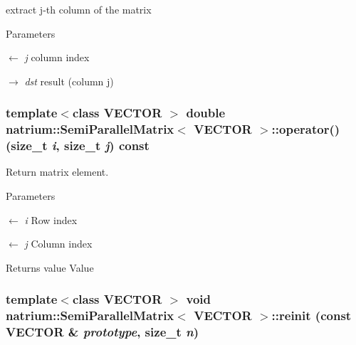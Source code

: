extract j-\/th column of the matrix 
\begin{DoxyParams}{Parameters}
\item[\mbox{$\leftarrow$} {\em j}]column index \item[\mbox{$\rightarrow$} {\em dst}]result (column j) \end{DoxyParams}
\hypertarget{classnatrium_1_1SemiParallelMatrix_afb8ed4b8c4a62a0271ea7b512f275555}{
\subsubsection[{operator()}]{\setlength{\rightskip}{0pt plus 5cm}template$<$class VECTOR $>$ double {\bf natrium::SemiParallelMatrix}$<$ VECTOR $>$::operator() (size\_\-t {\em i}, \/  size\_\-t {\em j}) const}}
\label{classnatrium_1_1SemiParallelMatrix_afb8ed4b8c4a62a0271ea7b512f275555}


Return matrix element. 
\begin{DoxyParams}{Parameters}
\item[\mbox{$\leftarrow$} {\em i}]Row index \item[\mbox{$\leftarrow$} {\em j}]Column index \end{DoxyParams}
\begin{DoxyReturn}{Returns}
value Value 
\end{DoxyReturn}
\hypertarget{classnatrium_1_1SemiParallelMatrix_ae84190bdc4b753f6dc874d229d0b11a7}{
\subsubsection[{reinit}]{\setlength{\rightskip}{0pt plus 5cm}template$<$class VECTOR $>$ void {\bf natrium::SemiParallelMatrix}$<$ VECTOR $>$::reinit (const VECTOR \& {\em prototype}, \/  size\_\-t {\em n})}}
\label{classnatrium_1_1SemiParallelMatrix_ae84190bdc4b753f6dc874d229d0b11a7}


